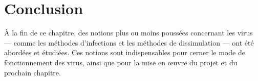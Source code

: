 
\section{Conclusion}
À la fin de ce chapitre, des notions plus ou moins poussées concernant les virus --- comme les méthodes d'infections 
et les méthodes de dissimulation --- ont été abordées et étudiées. Ces notions sont indispensables pour cerner le 
mode de fonctionnement des virus, ainsi que pour la mise en œuvre du projet et du prochain chapitre. %
